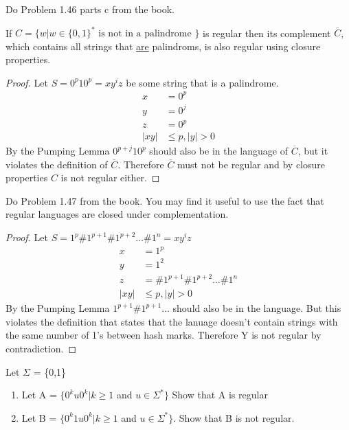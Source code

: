 \begin{problem}{4}
  Do Problem 1.46 parts c from the book.
  \begin{solution}
    If $C = \{ w|w \in \{ 0,1 \}^* \text{ is not in a palindrome }\}$ is regular then its complement $\overline{C}$, which contains
    all strings that \underline{are} palindroms, is also regular using closure properties.
    \begin{proof}
      Let $S = 0^p10^p = xy^iz$ be some string that is a palindrome. \\
      \begin{align*}
        x &= 0^p \\
        y &= 0^j \\
        z &= 0^p \\
        |xy| &\le p, |y| > 0
      \end{align*}
      By the Pumping Lemma $0^{p+j}10^p$ should also be in the language of $\overline{C}$, but it violates the definition of
      $\overline{C}$. Therefore $\overline{C}$ must not be regular and by closure properties $C$ is not regular either.
    \end{proof}
  \end{solution}
\end{problem}

\begin{problem}{5}
  Do Problem 1.47 from the book. You may find it useful to use the fact that regular languages are closed under
  complementation.
  \begin{solution}
    \begin{proof}
      Let $S = 1^p\#1^{p+1}\#1^{p+2}\ldots\#1^{n} = xy^iz$
      \begin{align*}
        x &= 1^p \\
        y &= 1^2 \\
        z &= \#1^{p + 1}\#1^{p + 2}\ldots\#1^{n} \\
        |xy| &\le p, |y| > 0
      \end{align*}
      By the Pumping Lemma $1^{p+1}\#1^{p+1}\ldots$ should also be in the language. But this violates the definition
      that states that the lanuage doesn't contain strings with the same number of 1's between hash marks. Therefore Y
      is not regular by contradiction.
    \end{proof}
  \end{solution}
\end{problem} \newpage

\begin{problem}{6}
  Let $\Sigma$ = \{0,1\}
  \begin{enumerate}
    \item Let A = $\{ 0^ku0^k | k \ge 1$ and $u \in \Sigma^* \}$ Show that A is regular \\
    \item Let B = $\{ 0^k1u0^k | k \ge 1$ and $u \in \Sigma^* \}$. Show that B is not regular.
  \end{enumerate}
\end{problem}

